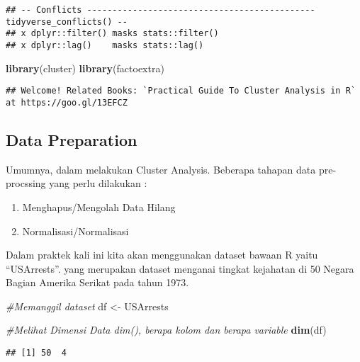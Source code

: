\documentclass[]{article}
\newenvironment{Shaded}{\begin{snugshade}}{\end{snugshade}}
\newcommand{\CommentTok}[1]{\textcolor[rgb]{0.56,0.35,0.01}{\textit{#1}}}
\newcommand{\KeywordTok}[1]{\textcolor[rgb]{0.13,0.29,0.53}{\textbf{#1}}}
\newcommand{\NormalTok}[1]{#1}
\newcommand{\StringTok}[1]{\textcolor[rgb]{0.31,0.60,0.02}{#1}}
\providecommand{\tightlist}{%
  \setlength{\itemsep}{0pt}\setlength{\parskip}{0pt}}
\begin{document}
\begin{verbatim}
## -- Conflicts --------------------------------------------- tidyverse_conflicts() --
## x dplyr::filter() masks stats::filter()
## x dplyr::lag()    masks stats::lag()
\end{verbatim}

\begin{Shaded}
\begin{Highlighting}[]
\KeywordTok{library}\NormalTok{(cluster)}
\KeywordTok{library}\NormalTok{(factoextra)}
\end{Highlighting}
\end{Shaded}

\begin{verbatim}
## Welcome! Related Books: `Practical Guide To Cluster Analysis in R` at https://goo.gl/13EFCZ
\end{verbatim}

\hypertarget{data-preparation}{%
\subsection{Data Preparation}\label{data-preparation}}

Umumnya, dalam melakukan Cluster Analysis. Beberapa tahapan data
pre-procssing yang perlu dilakukan :

\begin{enumerate}
\def\labelenumi{\arabic{enumi}.}
\tightlist
\item
  Menghapus/Mengolah Data Hilang
\item
  Normalisasi/Normalisasi
\end{enumerate}

Dalam praktek kali ini kita akan menggunakan dataset bawaan R yaitu
``USArrests''. yang merupakan dataset menganai tingkat kejahatan di 50
Negara Bagian Amerika Serikat pada tahun 1973.

\begin{Shaded}
\begin{Highlighting}[]
\CommentTok{#Memanggil dataset}
\NormalTok{df <-}\StringTok{ }\NormalTok{USArrests}

\CommentTok{#Melihat Dimensi Data dim(), berapa kolom dan berapa variable}
\KeywordTok{dim}\NormalTok{(df)}
\end{Highlighting}
\end{Shaded}

\begin{verbatim}
## [1] 50  4
\end{verbatim}
\end{document}
